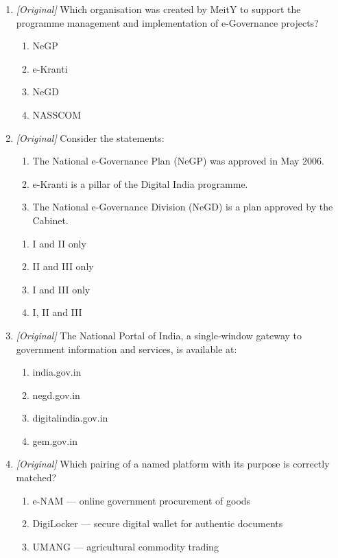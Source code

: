 \documentclass[11pt]{article}
\begin{document}
\begin{enumerate}[label=\textbf{Q\arabic*.}, leftmargin=*]
\begin{enumerate}[label=\Alph*.]
  \end{enumerate}
\item \textit{[Original]} Which organisation was created by MeitY to support
  the programme management and implementation of e-Governance projects?
  \begin{enumerate}[label=\Alph*.]
    \item NeGP
    \item e-Kranti
    \item NeGD
    \item NASSCOM
  \end{enumerate}
\item \textit{[Original]} Consider the statements:
  \begin{enumerate}[label=\Roman*.]
    \item The National e-Governance Plan (NeGP) was approved in May 2006.
    \item e-Kranti is a pillar of the Digital India programme.
    \item The National e-Governance Division (NeGD) is a plan approved by
      the Cabinet.
  \end{enumerate}
  \begin{enumerate}[label=\Alph*.]
    \item I and II only
    \item II and III only
    \item I and III only
    \item I, II and III
  \end{enumerate}
\item \textit{[Original]} The National Portal of India, a single-window
  gateway to government information and services, is available at:
  \begin{enumerate}[label=\Alph*.]
    \item india.gov.in
    \item negd.gov.in
    \item digitalindia.gov.in
    \item gem.gov.in
  \end{enumerate}
\item \textit{[Original]} Which pairing of a named platform with its purpose
  is correctly matched?
  \begin{enumerate}[label=\Alph*.]
    \item e-NAM --- online government procurement of goods
    \item DigiLocker --- secure digital wallet for authentic documents
    \item UMANG --- agricultural commodity trading

\end{enumerate}
\end{enumerate}
\end{document}
